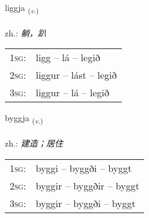 \documentclass[frontgrid, backgrid]{flacards}\usepackage[]{graphicx}\usepackage[]{xcolor}
\begin{document}
{liggja \small{\textsubscript{(\textit{v.})}} \\[1ex] %
\textphonetic{[lɪca]} \\
zh.: \emph{躺，趴} \\  [2ex]
\renewcommand*{\arraystretch}{0.8}
\begin{tabular}{p{1cm}l}
\textsc{1sg}: & ligg -- lá -- legið \\ 
\textsc{2sg}: & liggur -- lást -- legið \\ 
\textsc{3sg}: & liggur -- lá -- legið \\ 
\end{tabular}
}

\renewcommand{\flhead}{\vskip5pt \fboxsep=0pt {\small\bfseries\footnotesize Sagnorð | 动词}}
\renewcommand{\fcfoot}{\vskip5pt \fboxsep=0pt \hspace{2pt}{\small\bfseries\footnotesize 1K}}

\renewcommand{\blhead}{\vskip5pt {\small\bfseries\footnotesize Sagnorð | 动词 }}
\renewcommand{\bcfoot}{\vskip5pt \hspace{2pt}{\small\bfseries\footnotesize 1K}}


{byggja \small{\textsubscript{(\textit{v.})}} \\[1ex] %
\textphonetic{[pɪca]} \\
zh.: \emph{建造；居住} \\  [2ex]
\renewcommand*{\arraystretch}{0.8}
\begin{tabular}{p{1cm}l}
\textsc{1sg}: & byggi -- byggði -- byggt \\ 
\textsc{2sg}: & byggir -- byggðir -- byggt \\ 
\textsc{3sg}: & byggir -- byggði -- byggt \\ 
\end{tabular}
}

\renewcommand{\flhead}{\vskip5pt \fboxsep=0pt {\small\bfseries\footnotesize Nafnorð | 名词}}
\renewcommand{\fcfoot}{\vskip5pt \fboxsep=0pt \hspace{2pt}{\small\bfseries\footnotesize 1K}}
\end{document}
